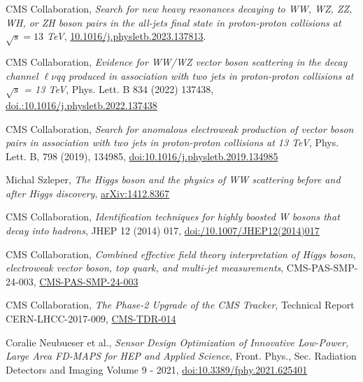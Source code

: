 {\begin{flushleft}
\end{flushleft}

\vskip 10pt
\begin{thebibliography}{9}
\bibitem{[1]}
CMS Collaboration, {\em Search for new heavy resonances decaying to WW, WZ, ZZ, WH, or ZH boson pairs in the all-jets final state in proton-proton collisions at $\sqrt{s}=13$ TeV},
\href{http://dx.doi.org/10.1016/j.physletb.2023.137813}{10.1016/j.physletb.2023.137813}.

\bibitem{[2]}
CMS Collaboration, {\em Evidence for WW/WZ vector boson scattering in the decay channel $\ell\nu$qq produced in association with two jets in proton-proton collisions at $\sqrt{s}$ = 13 TeV}, Phys. Lett. B 834 (2022) 137438, \href{https://doi.org/10.1016/j.physletb.2022.137438}{doi.:10.1016/j.physletb.2022.137438}

\bibitem{[3]}
CMS Collaboration, {\em Search for anomalous electroweak production of vector boson pairs in association with two jets in proton-proton collisions at 13 TeV}, Phys. Lett. B, 798 (2019), 134985, \href{https://doi.org/10.1016/j.physletb.2019.134985}{doi:10.1016/j.physletb.2019.134985}

\bibitem{[4]}
Michal Szleper, {\em The Higgs boson and the physics of WW scattering before and after Higgs discovery}, \href{https://arxiv.org/pdf/1412.8367}{arXiv:1412.8367}


\bibitem{[5]}
CMS Collaboration, {\em Identification techniques for highly boosted W bosons that decay into hadrons}, JHEP 12 (2014) 017, \href{https://link.springer.com/article/10.1007/JHEP12(2014)017}{doi:/10.1007/JHEP12(2014)017}

\bibitem{[6]}
CMS Collaboration, {\em Combined effective field theory interpretation of Higgs boson, electroweak vector boson, top quark, and multi-jet measurements}, CMS-PAS-SMP-24-003, \href{https://cds.cern.ch/record/2911229/}{CMS-PAS-SMP-24-003}

\bibitem{[7]}
CMS Collaboration, {\em The Phase-2 Upgrade of the CMS Tracker}, Technical Report CERN-LHCC-2017-009, \href{https://cds.cern.ch/record/2272264?ln=en}{CMS-TDR-014}

\bibitem{[8]}
Coralie Neubueser et al., {\em Sensor Design Optimization of Innovative Low-Power, Large Area FD-MAPS for HEP and Applied Science}, Front. Phys., Sec. Radiation Detectors and Imaging
Volume 9 - 2021, \href{https://doi.org/10.3389/fphy.2021.625401}{doi:10.3389/fphy.2021.625401}
\end{thebibliography}
}
